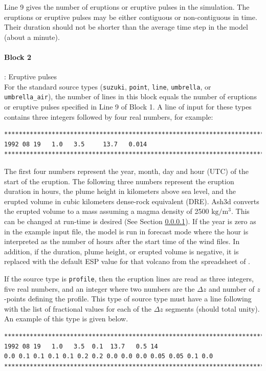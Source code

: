 Line 9 gives the number of eruptions or eruptive pulses in the simulation.
The eruptions or eruptive pulses may be either contiguous or non-contiguous
in time. Their duration should not be shorter than the average time step
in the model (about a minute).

\paragraph{Block 2}: Eruptive pulses\\
For the standard source types (\texttt{suzuki}, \texttt{point}, \texttt{line},
\texttt{umbrella}, or \texttt{umbrella\_air}),
the number of lines in this block equals the number of eruptions or eruptive
pulses specified in Line 9 of Block 1.
A line of input for these types contains three integers followed by four
real numbers, for example:
\small
\begin{verbatim}
*******************************************************************************
1992 08 19   1.0   3.5     13.7   0.014
*******************************************************************************
\end{verbatim}
\normalsize

The first four numbers represent the year, month, day and hour (UTC) of the
start of the eruption. The following three numbers represent the eruption
duration in hours, the plume height in kilometers above sea level, and the
erupted volume in cubic kilometers dense-rock equivalent (DRE). Ash3d converts
the erupted volume to a mass assuming a magma density of 2500 $\mathrm{kg/m^3}$.
This can be changed at run-time is desired (See Section \ref{}).
If the year is zero as in the example input file, the model is run in forecast
mode where the hour is interpreted as the number of hours after the start time
of the wind files. In addition, if the duration, plume height, or erupted volume
is negative, it is replaced with the default ESP value for that volcano from the
spreadsheet of \cite{Mastin09b}.

If the source type is \texttt{profile}, then the eruption lines are read as
three integers, five real numbers, and an integer where
two numbers are the $\Delta z$ and number of $z$-points defining
the profile.  This type of source type must have a line following with the list
of fractional values for each of the $\Delta z$ segments (should total unity).
An example of this type is given below.
\small
\begin{verbatim}
*******************************************************************************
1992 08 19   1.0   3.5  0.1  13.7   0.5 14
0.0 0.1 0.1 0.1 0.1 0.2 0.2 0.0 0.0 0.0 0.05 0.05 0.1 0.0
*******************************************************************************
\end{verbatim}
\normalsize

